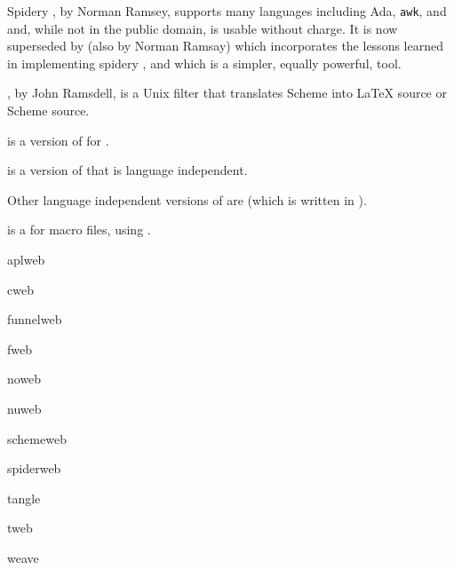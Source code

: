 Spidery , by Norman Ramsey, supports many 
languages including Ada, \texttt{awk}, and 
and, while not in the public domain, is usable without charge.  It is
now superseded by  (also by Norman Ramsay) which
incorporates the lessons learned in implementing spidery ,
and which is a simpler, equally powerful, tool.

, by John Ramsdell, is a Unix filter that
translates Scheme into \LaTeX{} source or Scheme source.

 is a version of  for .

 is a version of  that is language independent.

Other language independent versions of  are  (which
is written in  ).

 is a  for \plaintex{} macro files, using
.
\begin{ctanrefs}
\item[aplweb]
\item[cweb]
\item[funnelweb]
\item[fweb]
\item[noweb]
\item[nuweb]
\item[schemeweb]
\item[spiderweb]
\item[tangle]
\item[tweb]
\item[weave]
\end{ctanrefs}

